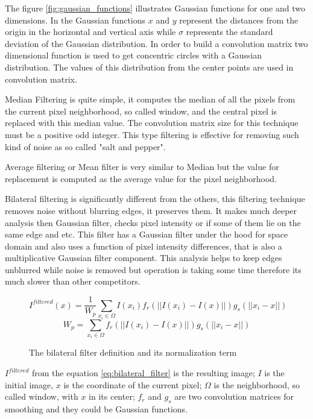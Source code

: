 \documentclass[../../../../main]{subfiles}
\begin{document}
The figure \ref{fig:gaussian_functions} illustrates Gaussian functions for one and two dimensions. In the Gaussian functions $x$ and $y$ represent the distances from the origin in the horizontal and vertical axis while $\sigma$ represents the standard deviation of the Gaussian distribution. In order to build a convolution matrix two dimensional function is used to get concentric circles with a Gaussian distribution. The values of this distribution from the center points are used in convolution matrix.

Median Filtering is quite simple, it computes the median of all the pixels from the current pixel neighborhood, so called window, and the central pixel is replaced with this median value. The convolution matrix size for this technique must be a positive odd integer. This type filtering is effective for removing such kind of noise as so called "salt and pepper".

Average filtering or Mean filter is very similar to Median but the value for replacement is computed as the average value for the pixel neighborhood.

Bilateral filtering is significantly different from the others, this filtering technique removes noise without blurring edges, it preserves them. It makes much deeper analysis then Gaussian filter, checks pixel intensity or if some of them lie on the same edge and etc. This filter has a Gaussian filter under the hood for space domain and also uses a function of pixel intensity differences, that is also a multiplicative Gaussian filter component. This analysis helps to keep edges unblurred while noise is removed but operation is taking some time therefore its much slower than other competitors.

\begin{figure} [!ht]
  \centering    
    \begin{equation}
    \label{eq:bilateral_filter}
        I^{filtered}(x)=\frac{1}{W_p}\sum_{x_i\in\Omega} I(x_i)f_r(||I(x_i)-I(x)||)g_s(||x_i-x||)
    \end{equation}
    \begin{equation}
       W_p=\sum_{x_i\in\Omega} f_r(||I(x_i)-I(x)||)g_s(||x_i-x||)
    \end{equation}
  \caption{The bilateral filter definition and its normalization term}
\end{figure}

$I^{filtered}$ from the equation \ref{eq:bilateral_filter} is the resulting image; $I$ is the initial image, $x$ is the coordinate of the current pixel; $\Omega$ is the neighborhood, so called window, with $x$ in its center; $f_r$ and $g_s$ are two convolution matrices for smoothing and they could be Gaussian functions.
\end{document}
